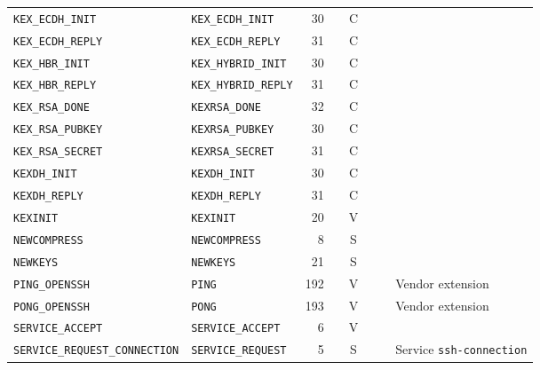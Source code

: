 \documentclass[sigconf,nonacm]{acmart}
\newcommand{\supported}{\faCircle}
\newcommand{\partialsupport}{\faAdjust}
\newcommand{\unsupported}{\faCircle[regular]}
\newcommand{\statMsg}{S}
\newcommand{\cryptoMsg}{C}
\newcommand{\varMsg}{V}
\begin{document}
\begin{table*}
\begin{tabular}{llrlcccl}
        \verb|KEX_ECDH_INIT| & \verb|KEX_ECDH_INIT| & 30 & \cite[Section 4]{rfc5656} & \cryptoMsg & \supported & \unsupported \\
        \verb|KEX_ECDH_REPLY| & \verb|KEX_ECDH_REPLY| & 31 & \cite[Section 4]{rfc5656} & \cryptoMsg & \unsupported & \supported \\
        \verb|KEX_HBR_INIT| & \verb|KEX_HYBRID_INIT| & 30 & \cite[Section 2.1]{ietf-sshm-mlkem-hybrid-kex-00} & \cryptoMsg & \supported & \unsupported \\
        \verb|KEX_HBR_REPLY| & \verb|KEX_HYBRID_REPLY| & 31 & \cite[Section 2.1]{ietf-sshm-mlkem-hybrid-kex-00} & \cryptoMsg & \unsupported & \supported \\
        \verb|KEX_RSA_DONE| & \verb|KEXRSA_DONE| & 32 & \cite[Section 4]{rfc4432} & \cryptoMsg & \unsupported & \supported \\
        \verb|KEX_RSA_PUBKEY| & \verb|KEXRSA_PUBKEY| & 30 & \cite[Section 4]{rfc4432} & \cryptoMsg & \unsupported & \supported \\
        \verb|KEX_RSA_SECRET| & \verb|KEXRSA_SECRET| & 31 & \cite[Section 4]{rfc4432} & \cryptoMsg & \supported & \unsupported \\
        \verb|KEXDH_INIT| & \verb|KEXDH_INIT| & 30 & \cite[Section 8]{rfc4253} & \cryptoMsg & \supported & \unsupported \\
        \verb|KEXDH_REPLY| & \verb|KEXDH_REPLY| & 31 & \cite[Section 8]{rfc4253} & \cryptoMsg & \unsupported & \supported \\
        \verb|KEXINIT| & \verb|KEXINIT| & 20 & \cite[Section 7.1]{rfc4253} & \varMsg & \supported & \supported \\
        \verb|NEWCOMPRESS| & \verb|NEWCOMPRESS| & 8 & \cite[Section 3.2]{rfc8308} & \statMsg & \supported & \unsupported \\
        \verb|NEWKEYS| & \verb|NEWKEYS| & 21 & \cite[Section 7.3]{rfc4253} & \statMsg & \supported & \supported \\
        \verb|PING_OPENSSH| & \verb|PING| & 192 & \cite[Section 1.9]{protocolopenssh} & \varMsg & \supported & \partialsupport & Vendor extension \\
        \verb|PONG_OPENSSH|  & \verb|PONG| & 193 & \cite[Section 1.9]{protocolopenssh} & \varMsg & \partialsupport & \supported & Vendor extension \\
        \verb|SERVICE_ACCEPT| & \verb|SERVICE_ACCEPT| & 6 & \cite[Section 10]{rfc4253} & \varMsg & \unsupported & \supported \\
        \verb|SERVICE_REQUEST_CONNECTION| & \verb|SERVICE_REQUEST| & 5 & \cite[Section 10]{rfc4253} & \statMsg & \supported & \unsupported & Service \texttt{ssh-connection} \\

\end{tabular}
\end{table*}
\end{document}
